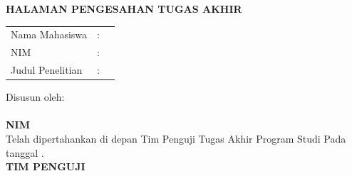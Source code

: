 
\newpage
{}
\begin{center}
        \textbf{\large \MakeUppercase{HALAMAN PENGESAHAN TUGAS AKHIR}}
\end{center}

\begin{tabular}{@{}lcp{6.5cm}}
	Nama Mahasiswa & : & \penulis\\
	NIM & : &  \nim\\
	Judul Penelitian & : & \judulid
\end{tabular}

\begin{center}
        \textbf{\large \MakeUppercase {\judulid}}
\end{center}

\vspace{5pt}

\begin{center}
    Disusun oleh:\\
    \textbf{\penulis}\\
    \textbf{NIM \nim}\\[1.5cm]

    Telah dipertahankan di depan Tim Penguji Tugas Akhir Program Studi {\prodi} {\fakultas} {\universitas} Pada tanggal {\tglpengesahan}.\\[1cm]

    \textbf{\MakeUppercase{TIM PENGUJI}}
\end{center}

